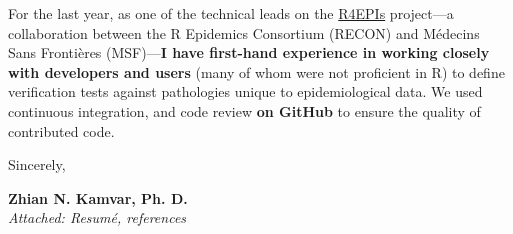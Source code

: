 \vspace{1ex}

For the last year, as one of the technical leads on the
\href{https://r4epis.netlify.com}{R4EPIs} project---a collaboration between the
R Epidemics Consortium (RECON) and M\'{e}decins Sans Fronti\`{e}res (MSF)---\textbf{I
have first-hand experience in working closely with developers and users} (many
of whom were not proficient in R) to define verification tests against
pathologies unique to epidemiological data. We used 
continuous integration, and code review \textbf{on GitHub} to ensure the quality of
contributed code.



\vspace{2ex}

Sincerely,

\vspace{5ex}

\textbf{Zhian N. Kamvar, Ph. D.}\\
\textit{Attached: Resum\'{e}, references}













\clearpage
